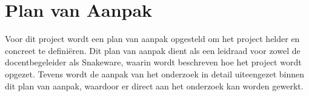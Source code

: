 \section{Plan van Aanpak}
Voor dit project wordt een plan van aanpak opgesteld om het project helder en concreet te definiëren.
Dit plan van aanpak dient als een leidraad voor zowel de docentbegeleider als Snakeware, waarin wordt beschreven hoe het project wordt opgezet.
Tevens wordt de aanpak van het onderzoek in detail uiteengezet binnen dit plan van aanpak, waardoor er direct aan het onderzoek kan worden gewerkt.
